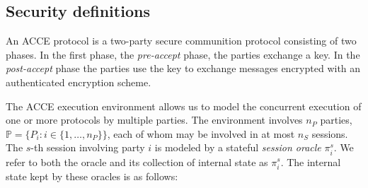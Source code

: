 \documentclass[USenglish,oneside,twocolumn]{article}
\theoremstyle{dgthm}
\theoremstyle{dgdef}
\newcommand{\p}[2]{\pi_{#1}^{#2}}
\begin{document}

\subsection{Security definitions}
    An ACCE protocol is a two-party secure communition protocol consisting of
    two phases.  In the first phase, the \emph{pre-accept} phase, the parties
    exchange a key. In the \emph{post-accept} phase the parties use the key to
    exchange messages encrypted with an authenticated encryption scheme.


    The ACCE execution environment allows us to model the concurrent execution
    of one or more protocols by multiple parties. The environment involves
    $n_P$ parties, $\mathbb{P} = \{P_i : i \in \{1, \dots, n_P\} \}$, each of whom may be
    involved in at most $n_S$ sessions. The $s$-th session involving party $i$
    is modeled by a stateful \emph{session oracle} $\p{i}{s}$.  We refer to
    both the oracle and its collection of internal state as $\p{i}{s}$. The
    internal state kept by these oracles is as follows:
\end{document}
